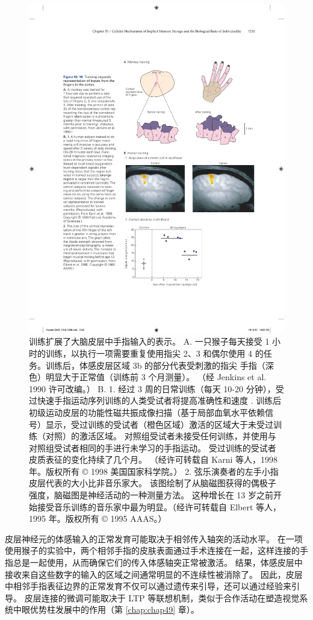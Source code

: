 \begin{figure}[htbp]
	\centering
	\includegraphics[width=0.7\linewidth]{chap53/fig_53_16}
	\caption{训练扩展了大脑皮层中手指输入的表示。 A. 一只猴子每天接受 1 小时的训练，以执行一项需要重复使用指尖 2、3 和偶尔使用 4 的任务。训练后，体感皮层区域 3b 的部分代表受刺激的指尖 手指（深色）明显大于正常值（训练前 3 个月测量）。 （经 Jenkins et al. 1990 许可改编。） B. 1. 经过 3 周的日常训练（每天 10-20 分钟），受过快速手指运动序列训练的人类受试者将提高准确性和速度 . 训练后初级运动皮层的功能性磁共振成像扫描（基于局部血氧水平依赖信号）显示，受过训练的受试者（橙色区域）激活的区域大于未受过训练（对照）的激活区域。 对照组受试者未接受任何训练，并使用与对照组受试者相同的手进行未学习的手指运动。 受过训练的受试者皮质表征的变化持续了几个月。 （经许可转载自 Karni 等人，1998 年。版权所有 © 1998 美国国家科学院。） 2. 弦乐演奏者的左手小指皮层代表的大小比非音乐家大。 该图绘制了从脑磁图获得的偶极子强度，脑磁图是神经活动的一种测量方法。 这种增长在 13 岁之前开始接受音乐训练的音乐家中最为明显。（经许可转载自 Elbert 等人，1995 年。版权所有 © 1995 AAAS。）}
	\label{fig:53_16}
\end{figure}

皮层神经元的体感输入的正常发育可能取决于相邻传入轴突的活动水平。 在一项使用猴子的实验中，两个相邻手指的皮肤表面通过手术连接在一起，这样连接的手指总是一起使用，从而确保它们的传入体感轴突正常被激活。 结果，体感皮层中接收来自这些数字的输入的区域之间通常明显的不连续性被消除了。 因此，皮层中相邻手指表征边界的正常发育不仅可以通过遗传来引导，还可以通过经验来引导。 皮层连接的微调可能取决于 LTP 等联想机制，类似于合作活动在塑造视觉系统中眼优势柱发展中的作用（第 \ref{chap:chap49} 章）。

